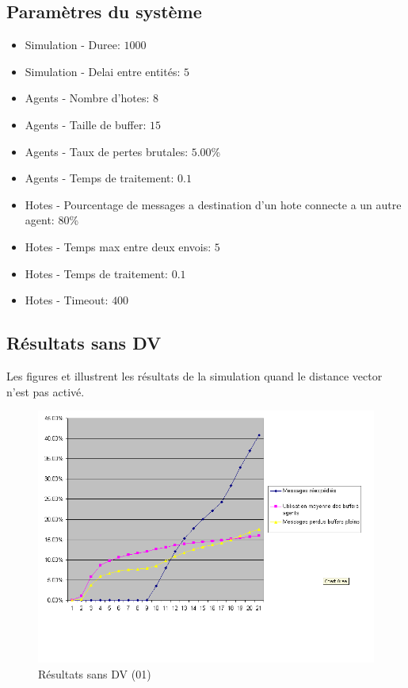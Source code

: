 \documentclass[a4paper,11pt]{article}
\begin{document}
\subsection{Paramètres du système}
\begin{itemize}
 \item Simulation - Duree: $1000$
 \item Simulation - Delai entre entités: $5$
 \item Agents - Nombre d'hotes: $8$
 \item Agents - Taille de buffer: $15$
 \item Agents - Taux de pertes brutales: $5.00$\%
 \item Agents - Temps de traitement: $0.1$
 \item Hotes - Pourcentage de messages a destination d'un hote connecte a un autre agent: $80$\%
 \item Hotes - Temps max entre deux envois: $5$
 \item Hotes - Temps de traitement: $0.1$
 \item Hotes - Timeout: $400$
\end{itemize}

\subsection{Résultats sans DV}
Les figures  et  illustrent les résultats de la simulation quand le distance vector n'est pas activé.
\begin{figure}[h!t]
  \centering
    \includegraphics[scale=0.55]{sansdv1}
  \caption{Résultats sans DV (01)}
  \label{fig:sansdv01}
\end{figure}
\end{document}

